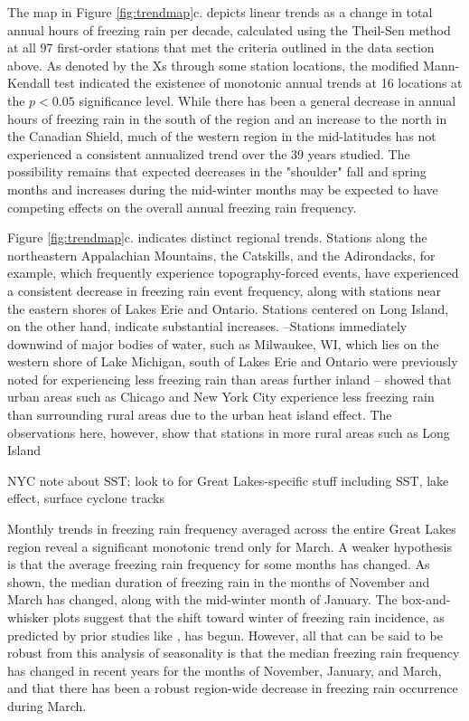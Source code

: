 \documentclass[twocol]{ametsoc}
\begin{document}

The map in Figure \ref{fig:trendmap}c. depicts linear trends as a change in total annual hours of freezing rain per decade, calculated using the Theil-Sen method at all 97 first-order stations that met the criteria outlined in the data section above. As denoted by the Xs through some station locations, the modified Mann-Kendall test indicated the existence of monotonic annual trends at 16 locations at the $p<0.05$ significance level. While there has been a general decrease in annual hours of freezing rain in the south of the region and an increase to the north in the Canadian Shield, much of the western region in the mid-latitudes has not experienced a consistent annualized trend over the 39 years studied. The possibility remains that expected decreases in the "shoulder" fall and spring months and increases during the mid-winter months may be expected to have competing effects on the overall annual freezing rain frequency.

Figure \ref{fig:trendmap}c. indicates distinct regional trends. Stations along the northeastern Appalachian Mountains, the Catskills, and the Adirondacks, for example, which frequently experience topography-forced events, have experienced a consistent decrease in freezing rain event frequency, along with stations near the eastern shores of Lakes Erie and Ontario. Stations centered on Long Island, on the other hand, indicate substantial increases. 
--Stations immediately downwind of major bodies of water, such as Milwaukee, WI, which lies on the western shore of Lake Michigan, 
south of Lakes Erie and Ontario were previously noted for experiencing less freezing rain than areas further inland 
--\citet{changnon2003urban} showed that urban areas such as Chicago and New York City experience less freezing rain than surrounding rural areas due to the urban heat island effect. The observations here, however, show that stations in more rural areas such as Long Island 

NYC note about SST: \citet{ramos2006sensitivity}
look to \citet{cortinas2000climatology} for Great Lakes-specific stuff including SST, lake effect, surface cyclone tracks

Monthly trends in freezing rain frequency averaged across the entire Great Lakes region reveal a significant monotonic trend only for March. A weaker hypothesis is that the average freezing rain frequency for some months has changed. As shown, the median duration of freezing rain in the months of November and March has changed, along with the mid-winter month of January. The box-and-whisker plots suggest that the shift toward winter of freezing rain incidence, as predicted by prior studies like \citet{cheng2011possible}, has begun. However, all that can be said to be robust from this analysis of seasonality is that the median freezing rain frequency has changed in recent years for the months of November, January, and March, and that there has been a robust region-wide decrease in freezing rain occurrence during March.
\end{document}
